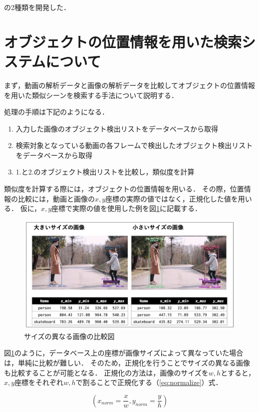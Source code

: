 \documentclass[a4j,12pt,dvipdfmx]{jreport}
\begin{document}
の2種類を開発した．

\section{オブジェクトの位置情報を用いた検索システムについて}
まず，動画の解析データと画像の解析データを比較してオブジェクトの位置情報を用いた類似シーンを検索する手法について説明する．

処理の手順は下記のようになる．
\begin{enumerate}
  \item 入力した画像のオブジェクト検出リストをデータベースから取得
  \item 検索対象となっている動画の各フレームで検出したオブジェクト検出リストをデータベースから取得
  \item 1.と2.のオブジェクト検出リストを比較し，類似度を計算
\end{enumerate}

類似度を計算する際には，オブジェクトの位置情報を用いる．
その際，位置情報の比較には，動画と画像の$x,y$座標の実際の値ではなく，正規化した値を用いる．
仮に，$x,y$座標で実際の値を使用した例を図\ref{fig:compare}に記載する．

\begin{figure}[H]
  \centering
  \includegraphics[width=13cm]{image/compare.jpg}
  \caption{サイズの異なる画像の比較図}
  \label{fig:compare}
\end{figure}

図\ref{fig:compare}のように，データベース上の座標が画像サイズによって異なっていた場合は，単純に比較が難しい．
そのため，正規化を行うことでサイズの異なる画像も比較することが可能となる．
正規化の方法は，画像のサイズを$w,h$とすると，$x,y$座標をそれぞれ$w,h$で割ることで正規化する（\ref{eq:normalize}）式．

\begin{equation}
  \label{eq:normalize}
  (x_{norm} = \frac{x}{w}, y_{norm} = \frac{y}{h})
\end{equation}
\end{document}
